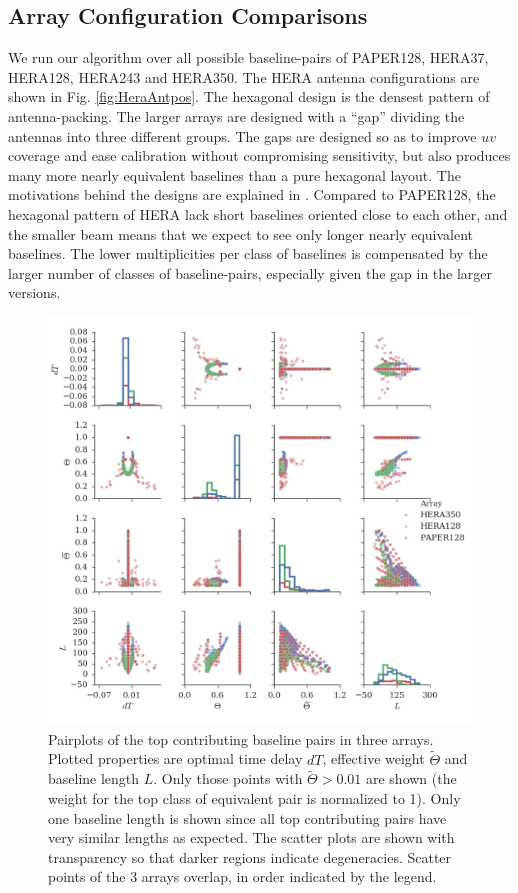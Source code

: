 \documentclass[twocolumn,apj,numberedappendix]{emulateapj}
\renewcommand\[{\begin{equation}}
\renewcommand\]{\end{equation}}
\begin{document}
\subsection{Array Configuration Comparisons \label{sec:arrconf}}
We run our algorithm over all possible baseline-pairs of  PAPER128, HERA37, HERA128, HERA243 and HERA350. The HERA antenna configurations are shown in Fig. \ref{fig:HeraAntpos}. The  
hexagonal design is the densest pattern of antenna-packing. The larger arrays are designed with a ``gap'' dividing the antennas into three different groups. The gaps are designed so as to improve $uv$ coverage and ease calibration without compromising sensitivity, but also produces many more nearly equivalent baselines than a pure hexagonal layout. The motivations behind the designs are explained in \cite{HERAconfiguration}.  Compared to PAPER128, the hexagonal pattern of HERA lack short baselines oriented close to each other, and the smaller beam means that we expect to see only longer nearly equivalent baselines. The lower multiplicities per class of baselines is compensated by the larger number of classes of baseline-pairs, especially given the gap in the larger versions. 

\begin{figure}[H]
\includegraphics[width=\linewidth]{pairplot}

\caption{Pairplots of the top contributing baseline pairs in three arrays. Plotted properties are optimal time delay $dT$,  effective weight $\widetilde{\Theta}$ and baseline length $L$. Only those points with $\widetilde{\Theta}>0.01$ are shown (the weight for the top class of equivalent pair is normalized to 1). Only one baseline length is shown since all top contributing pairs have very similar lengths as expected. The scatter plots are shown with transparency so that darker regions indicate degeneracies. Scatter points of the 3 arrays overlap, in order indicated by the legend. }
\label{fig:pairplot}
\end{figure}
\end{document}
